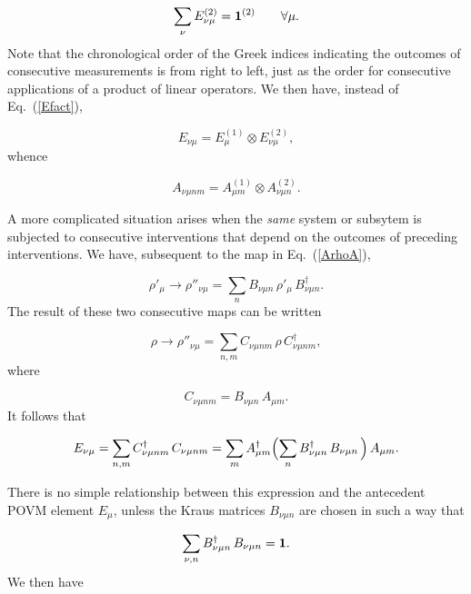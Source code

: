 \documentclass[12pt]{article}
\def\beq{\begin{equation}}
\def\eeq{\end{equation}}
\def\Eq{Eq.~(\ref}
\def\0{\otimes}
\begin{document}
\beq \sum_\nu E_{\nu\mu}^{(2)}={\bf1}^{(2)}\qquad\forall\mu. \eeq
Note that the chronological order of the Greek indices indicating the
outcomes of consecutive measurements is from right to left, just as the
order for consecutive applications of a product of linear operators. We
then have, instead of \Eq{Efact}),

\beq E_{\nu\mu}=E_\mu^{(1)}\0E_{\nu\mu}^{(2)}, \label{EEE}\eeq
whence

\beq A_{\nu\mu nm}=A_{\mu m}^{(1)}\0A_{\nu\mu n}^{(2)}. \label{AAA}\eeq

A more complicated situation arises when the {\it same\/} system or
subsytem is subjected to consecutive interventions that depend on the
outcomes of preceding interventions. We have, subsequent to the map in
\Eq{ArhoA}),

\beq \rho'_\mu\to\rho''_{\nu\mu}=\sum_n B_{\nu\mu n}\,\rho'_\mu\,
 B_{\nu\mu n}^\dagger.\eeq
The result of these two consecutive maps can be written

\beq \rho\to\rho''_{\nu\mu}=\sum_{n,m} C_{\nu\mu nm}\,\rho\,
 C_{\nu\mu nm}^\dagger,\eeq
where

\beq C_{\nu\mu nm}=B_{\nu\mu n}\,A_{\mu m}.\eeq
It follows that

\beq E_{\nu\mu}=\sum_{n,m} C_{\nu\mu nm}^\dagger\,C_{\nu\mu nm}=
 \sum_m A_{\mu m}^\dagger \Bigl(\sum_n B_{\nu\mu n}^\dagger\,
 B_{\nu\mu n}\,\Bigr)\,A_{\mu m}. \eeq

There is no simple relationship between this expression and the
antecedent POVM element $E_\mu$, unless the Kraus matrices $B_{\nu\mu
n}$ are chosen in such a way that

\beq \sum_{\nu,n}B_{\nu\mu n}^\dagger\,B_{\nu\mu n}={\bf1}.\eeq
We then have
\end{document}
